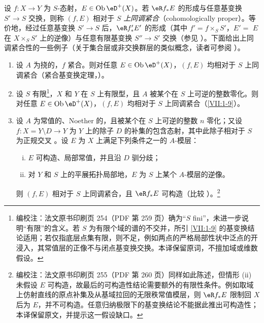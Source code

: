 设 $f:X\to Y$ 为 $S$-态射，$E\in\ob\eD^+(X)$。若 $\eR f_\ast E$ 的形成与任意基变换 $S'\to S$ 交换，则称 $(f,E)$ 相对于 $S$ \emph{上同调紧合}（cohomologically proper）。等价地，经过任意基变换 $S'\to S$ 后，$\eR f_\ast' E'$ 的形成（其中 $f'=f\times_S S'$，$E'=$ $E$ 在 $X\times_S S'$ 上的逆像）与任意有限基变换 $S'' \to S'$ 交换（参见 \cite[XII 6.1]{sga4}）。下面给出上同调紧合性的一些例子（关于集合层或非交换群层的类似概念，读者可参阅 \cite[XIII]{sga1}）。
\begin{enumerate} %
  \item 设 $A$ 为挠的，$f$ 紧合。则对任意 $E\in\ob\eD^+(X)$，$(f,E)$ 均相对于 $S$ 上同调紧合（紧合基变换定理，\cite[XII 5.1]{sga4}）。
  \item 设 $S$ 有限\footnote{编校注：法文原书印刷页 254（PDF 第 259 页）确为“$S$ fini”，未进一步说明“有限”的含义。若 $S$ 为有限个域的谱的不交并，所引 \ref{VII:1-9} 的基变换结论适用；若仅指底层点集有限，则不足，例如两点的严格局部性状中泛点的开浸入，其常值层的正像不与闭点基变换交换。本译保留原词，不擅加域或维数假设。}，$X$ 和 $Y$ 在 $S$ 上有限型，且 $A$ 被某个在 $S$ 上可逆的整数零化。则对任意 $E\in\ob\eD^+(X)$，$(f,E)$ 均相对于 $S$ 上同调紧合（\ref{VII:1-9}）。
  \item 设 $A$ 为常值的、Noether 的，且被某个在 $S$ 上可逆的整数 $n$ 零化；又设 $f:X=Y\setminus D\to Y$ 为 $Y$ 上的除子 $D$ 的补集的包含态射，其中此除子相对于 $S$ 为正规交叉 \cite[XIII 2.1]{sga1}。设 $E$ 为 $X$ 上满足下列条件之一的 $A$-模层：
    \begin{enumerate}[(i)]
      \item $E$ 可构造、局部常值，并且沿 $D$ 驯分歧；
      \item 对 $Y$ 和 $S$ 上的平展拓扑局部地，$E$ 为 $S$ 上某个 $A$-模层的逆像。
    \end{enumerate}
    则 $(f,E)$ 相对于 $S$ 上同调紧合，且 $\eR f_\ast E$ 可构造（比较 \cite[XIII 2.4]{sga1}）。\footnote{编校注：法文原书印刷页 255（PDF 第 260 页）同样如此陈述，但情形 (ii) 未假设 $E$ 可构造，故最后的可构造性结论需要额外的有限性条件。例如取域上仿射直线的原点补集及从基域拉回的无限秩常值模层，则 $\eR f_\ast E$ 限制回 $X$ 后为 $E$，并不可构造。任意归纳极限下的基变换结论不能据此推出可构造性；本译保留原文，并提示这一假设缺口。}
\end{enumerate}

